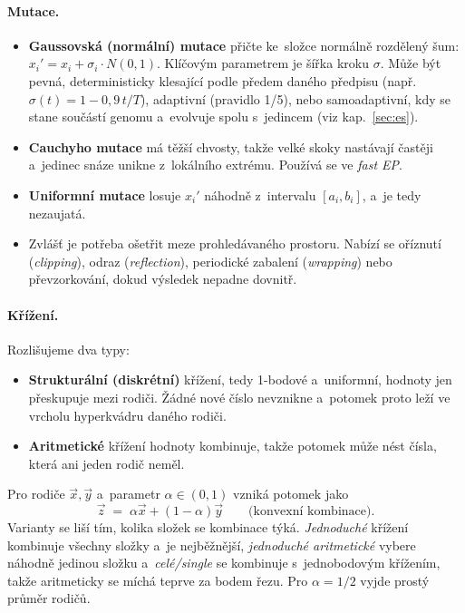 \documentclass[11pt,a4paper]{article}
\theoremstyle{definition}
\begin{document}
\paragraph{Mutace.}
\begin{itemize}
\item \textbf{Gaussovská (normální) mutace} přičte ke~složce normálně rozdělený šum:
  $x_i' = x_i + \sigma_i \cdot N(0,1)$. Klíčovým parametrem je šířka kroku $\sigma$.
  Může být pevná, deterministicky klesající podle předem daného předpisu
  (např.\ $\sigma(t) = 1 - 0{,}9\,t/T$), adaptivní (pravidlo 1/5), nebo samoadaptivní,
  kdy se stane součástí genomu a~evolvuje spolu s~jedincem (viz kap.~\ref{sec:es}).
\item \textbf{Cauchyho mutace} má těžší chvosty, takže velké skoky nastávají častěji
  a~jedinec snáze unikne z~lokálního extrému. Používá se ve \emph{fast EP}.
\item \textbf{Uniformní mutace} losuje $x_i'$ náhodně z~intervalu $[a_i, b_i]$, a~je
  tedy nezaujatá.
\item Zvlášť je potřeba ošetřit meze prohledávaného prostoru. Nabízí se oříznutí
  (\emph{clipping}), odraz (\emph{reflection}), periodické zabalení (\emph{wrapping})
  nebo převzorkování, dokud výsledek nepadne dovnitř.
\end{itemize}

\paragraph{Křížení.} Rozlišujeme dva typy:
\begin{itemize}
\item \textbf{Strukturální (diskrétní)} křížení, tedy 1-bodové a~uniformní, hodnoty jen
  přeskupuje mezi rodiči. Žádné nové číslo nevznikne a~potomek proto leží ve vrcholu
  hyperkvádru daného rodiči.
\item \textbf{Aritmetické} křížení hodnoty kombinuje, takže potomek může nést čísla,
  která ani jeden rodič neměl.
\end{itemize}

\begin{defbox}
Pro rodiče $\vec x, \vec y$ a~parametr $\alpha \in (0,1)$ vzniká potomek jako
\[
\vec z \;=\; \alpha \vec x + (1-\alpha)\vec y \qquad\text{(konvexní kombinace)}.
\]
Varianty se liší tím, kolika složek se kombinace týká. \emph{Jednoduché} křížení
kombinuje všechny složky a~je nejběžnější, \emph{jednoduché aritmetické} vybere náhodně
jedinou složku a~\emph{celé/single} se kombinuje s~jednobodovým křížením, takže
aritmeticky se míchá teprve za bodem řezu. Pro $\alpha = 1/2$ vyjde prostý průměr rodičů.
\end{defbox}
\end{document}
